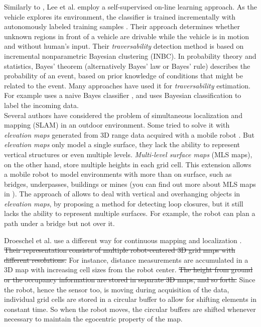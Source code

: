 \documentclass[12pt,a4paper]{report}
\newcommand{\etal}[1]{#1 et al.}
\newcommand{\term}{\textit}
\newcommand{\acronym}{\MakeUppercase}
\begin{document}
	Similarly to \cite{Kim}, \etal{Lee} employ a self-supervised on-line learning 
	approach. As the vehicle explores its environment, the classifier is trained 
	incrementally with autonomously labeled training samples \cite{Lee}. Their 
	approach determines whether unknown regions in front of a vehicle are drivable 
	while the vehicle is in motion and without human’s input. Their 
	\term{traversability} detection method is based on incremental nonparametric 
	Bayesian clustering (\acronym{inbc}). In probability theory and statistics, 
	Bayes' theorem (alternatively Bayes' law or Bayes' rule) describes the 
	probability of an event, based on prior knowledge of conditions that might be 
	related to the event. Many approaches have used it for \term{traversability} 
	estimation. For example \cite{Suger} uses a naive Bayes classifier \cite{Denis}, 
	and \cite{Lalonde} uses Bayesian classification to label the incoming data.
	\\
	
	Several authors have considered the problem of simultaneous localization and 
	mapping (\acronym{slam}) in an outdoor environment. Some tried to solve it with 
	\term{elevation maps} generated from \acronym{3d} range data acquired with a 
	mobile robot \cite{Pfaff}. But \term{elevation maps} only model a single surface, 
	they lack the ability to represent vertical structures or even multiple levels.
	\term{Multi-level surface maps} (\acronym{mls} maps), on the other hand, store 
	multiple heights in each grid cell. This extension allows a mobile robot to model 
	environments with more than on surface, such as bridges, underpasses, buildings 
	or mines (you can find out more about \acronym{mls} maps in \cite{Triebel}). The 
	approach of \cite{Pfaff} allows to deal with vertical and overhanging objects in 
	\term{elevation maps}, by proposing a method for detecting loop closures, but it 
	still lacks the ability to represent multiple surfaces. For example, the robot 
	can plan a path under a bridge but not over it.
	\par
	\etal{Droeschel} use a different way for continuous mapping and localization 
	\cite{Droeschel}. \sout{Their representation consists of multiple robot-centered 
	\acronym{3d} grid maps with different resolutions.} For instance, distance 
	measurements are accumulated in a \acronym{3d} map with increasing cell sizes 
	from the robot center. \sout{The height from ground or the occupancy information are 
	stored in separate \acronym{3d} maps, and so forth.} Since the robot, hence the 
	sensor too, is moving during acquisition of the data, individual grid cells are 
	stored in a circular buffer to allow for shifting elements in constant time. So 
	when the robot moves, the circular buffers are shifted whenever necessary to 
	maintain the egocentric property of the map.
	
\end{document}
